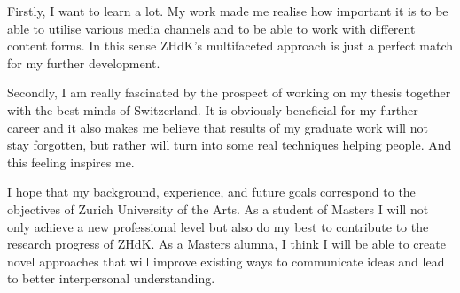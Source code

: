 \documentclass[11pt, a4paper]{awesome-cv}
\begin{document}
\begin{cvletter}
Firstly, I want to learn a lot. My work made me realise how important it is to be able to utilise various media channels and to be able to work with different content forms. In this sense ZHdK's multifaceted approach is just a perfect match for my further development.

Secondly, I am really fascinated by the prospect of working on my thesis together with the best minds of Switzerland. It is obviously beneficial for my further career and it also makes me believe that results of my graduate work will not stay forgotten, but rather will turn into some real techniques helping people. And this feeling inspires me.

I hope that my background, experience, and future goals correspond to the objectives of Zurich University of the Arts. As a student of Masters I will not only achieve a new professional level but also do my best to contribute to the research progress of ZHdK. As a Masters alumna, I think I will be able to create novel approaches that will improve existing ways to communicate ideas and lead to better interpersonal understanding.

\end{cvletter}


\makeletterclosing
\end{document}
